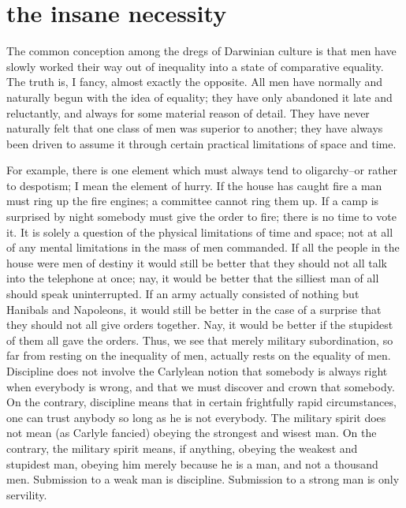 \documentclass[final,10pt,letterpaper,twocolumn,openany]{book}
\begin{document}
\section{the insane necessity}

    The common conception among the dregs of Darwinian culture is that
men have slowly worked their way out of inequality into a state of
comparative equality. The truth is, I fancy, almost exactly the opposite. All
men have normally and naturally begun with the idea of equality; they
have only abandoned it late and reluctantly, and always for some material
reason of detail. They have never naturally felt that one class of men was
superior to another; they have always been driven to assume it through
certain practical limitations of space and time.

For example, there is one element which must always tend to
oligarchy--or rather to despotism; I mean the element of hurry. If the
house has caught fire a man must ring up the fire engines; a committee
cannot ring them up. If a camp is surprised by night somebody must give
the order to fire; there is no time to vote it. It is solely a question of the
physical limitations of time and space; not at all of any mental limitations
in the mass of men commanded. If all the people in the house were men of
destiny it would still be better that they should not all talk into the
telephone at once; nay, it would be better that the silliest man of all should
speak uninterrupted. If an army actually consisted of nothing but Hanibals
and Napoleons, it would still be better in the case of a surprise that they
should not all give orders together. Nay, it would be better if the stupidest
of them all gave the orders. Thus, we see that merely military
subordination, so far from resting on the inequality of men, actually rests
on the equality of men. Discipline does not involve the Carlylean notion
that somebody is always right when everybody is wrong, and that we must
discover and crown that somebody. On the contrary, discipline means that
in certain frightfully rapid circumstances, one can trust anybody so long as
he is not everybody. The military spirit does not mean (as Carlyle fancied)
obeying the strongest and wisest man. On the contrary, the military spirit
means, if anything, obeying the weakest and stupidest man, obeying him
merely because he is a man, and not a thousand men. Submission to a
weak man is discipline. Submission to a strong man is only servility.
\end{document}
